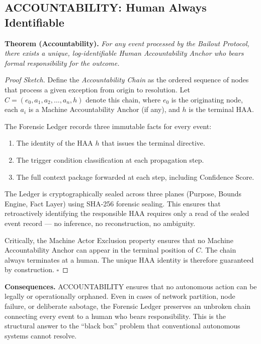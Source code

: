 \subsection{ACCOUNTABILITY: Human Always Identifiable}

\textbf{Theorem (Accountability).} \emph{For any event processed by the Bailout Protocol, there exists a unique, log-identifiable Human Accountability Anchor who bears formal responsibility for the outcome.}

\begin{proof}[Proof Sketch]
Define the \emph{Accountability Chain} as the ordered sequence of nodes that process a given exception from origin to resolution. Let $C = (e_0, a_1, a_2, \dots, a_n, h)$ denote this chain, where $e_0$ is the originating node, each $a_i$ is a Machine Accountability Anchor (if any), and $h$ is the terminal HAA.

The Forensic Ledger records three immutable facts for every event:
\begin{enumerate}
    \item The identity of the HAA $h$ that issues the terminal directive.
    \item The trigger condition classification at each propagation step.
    \item The full context package forwarded at each step, including Confidence Score.
\end{enumerate}

The Ledger is cryptographically sealed across three planes (Purpose, Bounds Engine, Fact Layer) using SHA-256 forensic sealing. This ensures that retroactively identifying the responsible HAA requires only a read of the sealed event record — no inference, no reconstruction, no ambiguity.

Critically, the Machine Actor Exclusion property ensures that no Machine Accountability Anchor can appear in the terminal position of $C$. The chain always terminates at a human. The unique HAA identity is therefore guaranteed by construction. \hfill $\square$
\end{proof}

\textbf{Consequences.} ACCOUNTABILITY ensures that no autonomous action can be legally or operationally orphaned. Even in cases of network partition, node failure, or deliberate sabotage, the Forensic Ledger preserves an unbroken chain connecting every event to a human who bears responsibility. This is the structural answer to the ``black box'' problem that conventional autonomous systems cannot resolve.

